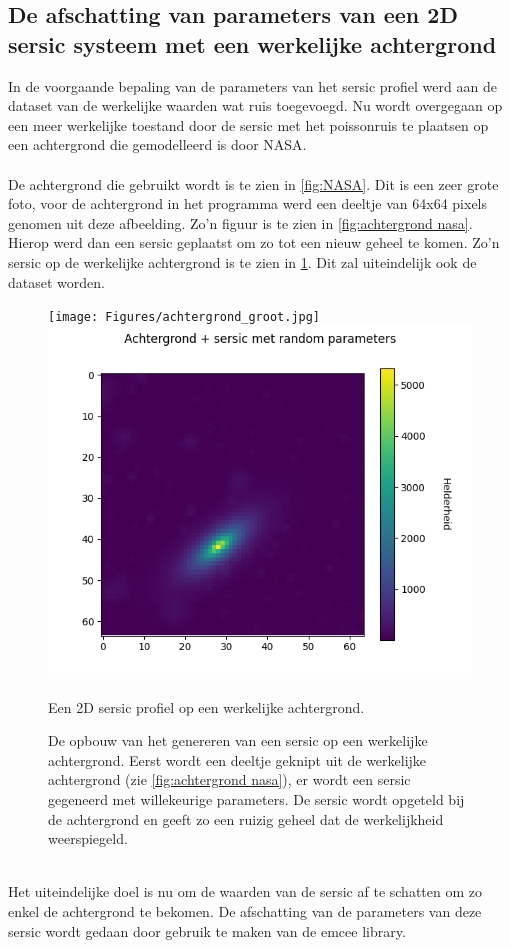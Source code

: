 \subsection{De afschatting van parameters van een 2D sersic systeem met een werkelijke achtergrond}
In de voorgaande bepaling van de parameters van het sersic profiel werd aan de dataset van de werkelijke waarden wat ruis toegevoegd. Nu wordt overgegaan op een meer werkelijke toestand door de sersic met het poissonruis te plaatsen op een achtergrond die gemodelleerd is door NASA. \\ \\
De achtergrond die gebruikt wordt is te zien in \cref{fig:NASA}. Dit is een zeer grote foto, voor de achtergrond in het programma werd een deeltje van 64x64 pixels genomen uit deze afbeelding. Zo'n figuur is te zien in \cref{fig:achtergrond nasa}.
Hierop werd dan een sersic geplaatst om zo tot een nieuw geheel te komen. Zo'n sersic op de werkelijke achtergrond is te zien in \cref{fig:achtergrond+sersic}. Dit zal uiteindelijk ook de dataset worden.
\begin{figure}
    \begin{minipage}{0.98\linewidth}
        \centering
       \texttt{[image: Figures/achtergrond\_groot.jpg]}
        \label{fig:NASA} 
        \includegraphics[width=0.85\linewidth]{Figures/sersic+achtergrond_656679_clip2.png}
        \caption{Een 2D sersic profiel op een werkelijke achtergrond.}
        \label{fig:achtergrond+sersic}
    \end{minipage}
    \caption{De opbouw van het genereren van een sersic op een werkelijke achtergrond. Eerst wordt een deeltje geknipt uit de werkelijke achtergrond (zie \cref{fig:achtergrond nasa}), er wordt een sersic gegeneerd met willekeurige parameters. De sersic wordt opgeteld bij de achtergrond en geeft zo een ruizig geheel dat de werkelijkheid weerspiegeld.}
\end{figure}
\\
Het uiteindelijke doel is nu om de waarden van de sersic af te schatten om zo enkel de achtergrond te bekomen. De afschatting van de parameters van deze sersic wordt gedaan door gebruik te maken van de emcee library.
\\ \\

